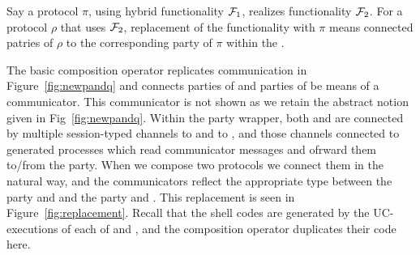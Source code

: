 Say a protocol $\pi$, using hybrid functionality $\mathcal{F}_1$, realizes functionality $\mathcal{F}_2$. 
For a protocol $\rho$ that uses $\mathcal{F}_2$, replacement of the functionality with $\pi$ means connected patries of $\rho$ to the corresponding party of $\pi$ within the \partywrapper.

The basic composition operator replicates communication in Figure~\ref{fig:newpandq} and connects parties of \RHO and parties of \PI be means of a communicator. This communicator is not shown as we retain the abstract notion given in Fig~\ref{fig:newpandq}.
Within the party wrapper, both \RHO and \PI are connected by multiple session-typed channels to \Z and to \F, and those channels connected to generated processes which read communicator messages and ofrward them to/from the party.
When we compose two protocols we connect them in the natural way, and the communicators reflect the appropriate type between the party and \Z and the party and \F. This replacement is seen in Figure~\ref{fig:replacement}.
Recall that the shell codes are generated by the UC-executions of each of \RHO and \PI, and the composition operator duplicates their code here.

%


